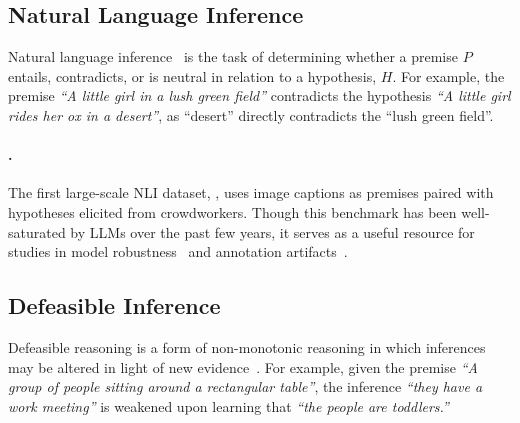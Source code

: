\subsection{Natural Language Inference}
Natural language inference~\cite{giampiccolo2007third, maccartney2009natural, bowman-etal-2015-large} is the task of determining whether a premise $P$ entails, contradicts, or is neutral in relation to a hypothesis, $H$.
%
For example, the premise \textit{``A little girl in a lush green field''} contradicts the hypothesis \textit{``A little girl rides her ox in a desert''}, as ``desert'' directly contradicts the ``lush green field''.

\paragraph{\snli.}
The first large-scale NLI dataset, \snli, uses image captions as premises paired with hypotheses elicited from crowdworkers.
%
Though this benchmark has been well-saturated by LLMs over the past few years, it serves as a useful resource for studies in model robustness~\cite{srikanth-rudinger-2022-partial, kaushik2019learning} and annotation artifacts~\cite{gururangan-etal-2018-annotation}.

\subsection{Defeasible Inference}

Defeasible reasoning is a form of non-monotonic reasoning in which inferences may be altered in light of new evidence~\cite{reiter1980logic}.
%
For example, given the premise \textit{``A group of people sitting around a rectangular table''}, the inference \textit{``they have a work meeting''} is weakened upon learning that \textit{``the people are toddlers.''}


